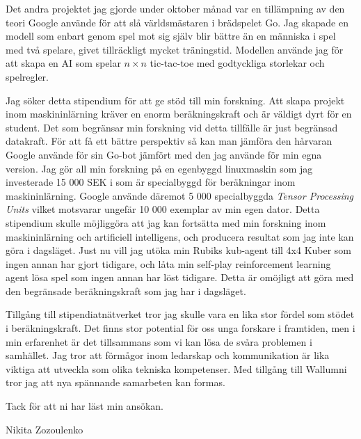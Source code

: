 \documentclass[11pt,a4paper]{article} %
\begin{document}
Det andra projektet jag gjorde under oktober månad var en tillämpning av den teori Google använde för att slå världsmästaren i brädspelet Go. Jag skapade en modell som enbart genom spel mot sig själv blir bättre än en människa i spel med två spelare, givet tillräckligt mycket träningstid. Modellen använde jag för att skapa en AI som spelar $n \times n$ tic-tac-toe med godtyckliga storlekar och spelregler. 

Jag söker detta stipendium för att ge stöd till min forskning. Att skapa projekt inom maskininlärning kräver en enorm beräkningskraft och är väldigt dyrt för en student. Det som begränsar min forskning vid detta tillfälle är just begränsad datakraft. För att få ett bättre perspektiv så kan man jämföra den hårvaran Google använde för sin Go-bot jämfört med den jag använde för min egna version. Jag gör all min forskning på en egenbyggd linuxmaskin som jag investerade 15 000 SEK i som är specialbyggd för beräkningar inom maskininlärning. Google använde däremot 5 000 specialbyggda \textit{Tensor Processing Units} vilket motsvarar ungefär 10 000 exemplar av min egen dator. Detta stipendium skulle möjliggöra att jag kan fortsätta med min forskning inom maskininlärning och artificiell intelligens, och producera resultat som jag inte kan göra i dagsläget. Just nu vill jag utöka min Rubiks kub-agent till 4x4 Kuber som ingen annan har gjort tidigare, och låta min self-play reinforcement learning agent lösa spel som ingen annan har löst tidigare. Detta är omöjligt att göra med den begränsade beräkningskraft som jag har i dagsläget. 

Tillgång till stipendiatnätverket tror jag skulle vara en lika stor fördel som stödet i beräkningskraft. Det finns stor potential för oss unga forskare i framtiden, men i min erfarenhet är det tillsammans som vi kan lösa de svåra problemen i samhället. Jag tror att förmågor inom ledarskap och kommunikation är lika viktiga att utveckla som olika tekniska kompetenser. Med tillgång till Wallumni tror jag att nya spännande samarbeten kan formas.  

Tack för att ni har läst min ansökan. 

Nikita Zozoulenko 


\end{document}
